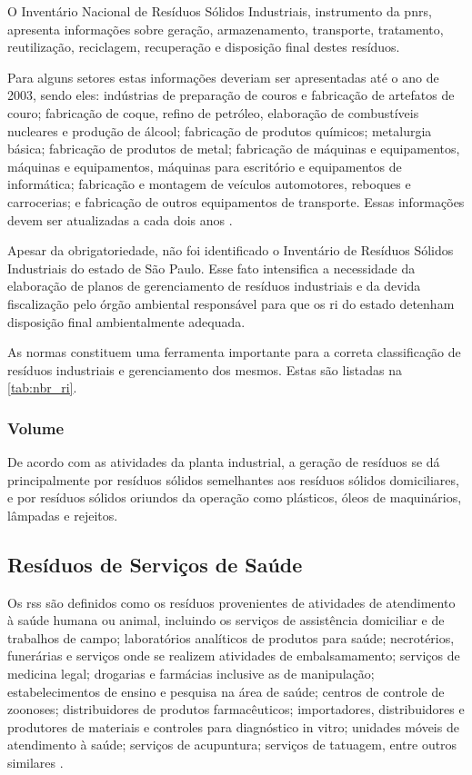 	O Inventário Nacional de Resíduos Sólidos Industriais, instrumento da \gls{pnrs}, apresenta informações sobre geração, armazenamento, transporte, tratamento, reutilização, reciclagem, recuperação e disposição final destes resíduos. 
	
	Para alguns setores estas informações deveriam ser apresentadas até o ano de 2003, sendo eles: indústrias de preparação de couros e fabricação de artefatos de couro; fabricação de coque, refino de petróleo, elaboração de combustíveis nucleares e produção de álcool; fabricação de produtos químicos; metalurgia básica; fabricação de produtos de metal; fabricação de máquinas e equipamentos, máquinas e equipamentos, máquinas para escritório e equipamentos de informática; fabricação e montagem de veículos automotores, reboques e carrocerias; e fabricação de outros equipamentos de transporte. Essas informações devem ser atualizadas a cada dois anos \cite{conama:313}.
	
	Apesar da obrigatoriedade, não foi identificado o Inventário de Resíduos Sólidos Industriais do estado de São Paulo. Esse fato intensifica a necessidade da elaboração de planos de gerenciamento de resíduos industriais e da devida fiscalização pelo órgão ambiental responsável para que os \gls{ri} do estado detenham disposição final ambientalmente adequada.
	
	As normas constituem uma ferramenta importante para a correta classificação de resíduos industriais e gerenciamento dos mesmos. Estas são listadas na \autoref{tab:nbr_ri}.
	
	
	
	\subsubsection{Volume}
	De acordo com as atividades da planta industrial, a geração de resíduos se dá principalmente por resíduos sólidos semelhantes aos resíduos sólidos domiciliares, e por resíduos sólidos oriundos da operação como plásticos, óleos de maquinários, lâmpadas e rejeitos.
	
	
	\subsection{Resíduos de Serviços de Saúde}
	Os \gls{rss} são definidos como os resíduos provenientes de atividades de atendimento à saúde humana ou animal, incluindo os serviços de assistência domiciliar e de trabalhos de campo; laboratórios analíticos de produtos para saúde; necrotérios, funerárias e serviços onde se realizem atividades de embalsamamento; serviços de medicina legal; drogarias e farmácias inclusive as de manipulação; estabelecimentos de ensino e pesquisa na área de saúde; centros de controle de zoonoses; distribuidores de produtos farmacêuticos; importadores, distribuidores e produtores de materiais e controles para diagnóstico in vitro; unidades móveis de atendimento à saúde; serviços de acupuntura; serviços de tatuagem, entre outros similares \cite{conama:362}.
	
